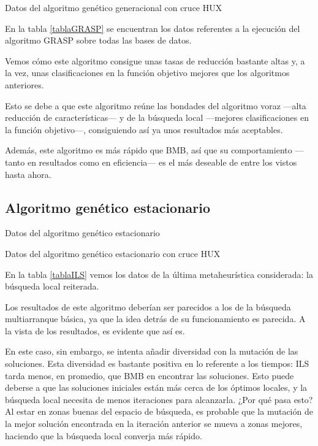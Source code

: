 \documentclass[a4paper, 11pt, titlepage]{article}
\begin{document}
    \begin{table}[!htb]
        \maketable{\dataAGGHUX}
        \caption{Datos del algoritmo genético generacional con cruce HUX}
        \label{tablaAGGHUX}
    \end{table}

    En la tabla \ref{tablaGRASP} se encuentran los datos referentes a la ejecución del algoritmo GRASP sobre todas las bases de datos.

    Vemos cómo este algoritmo consigue unas tasas de reducción bastante altas y, a la vez, unas clasificaciones en la función objetivo mejores que los algoritmos anteriores.

    Esto se debe a que este algoritmo reúne las bondades del algoritmo voraz ---alta reducción de características--- y de la búsqueda local ---mejores clasificaciones en la función objetivo---, consiguiendo así ya unos resultados más aceptables.

    Además, este algoritmo es más rápido que BMB, así que su comportamiento ---tanto en resultados como en eficiencia--- es el más deseable de entre los vistos hasta ahora.


    \subsection{Algoritmo genético estacionario}
    \begin{table}[!htb]
        \maketable{\dataAGE}
        \caption{Datos del algoritmo genético estacionario}
        \label{tablaAGE}
    \end{table}

    \begin{table}[!htb]
        \maketable{\dataAGEHUX}
        \caption{Datos del algoritmo genético estacionario con cruce HUX}
        \label{tablaAGEHUX}
    \end{table}

    En la tabla \ref{tablaILS} vemos los datos de la última metaheurística considerada: la búsqueda local reiterada.

    Los resultados de este algoritmo deberían ser parecidos a los de la búsqueda multiarranque básica, ya que la idea detrás de su funcionamiento es parecida. A la vista de los resultados, es evidente que así es.

    En este caso, sin embargo, se intenta añadir diversidad con la mutación de las soluciones. Esta diversidad es bastante positiva en lo referente a los tiempos: ILS tarda menos, en promedio, que BMB en encontrar las soluciones. Esto puede deberse a que las soluciones iniciales están más cerca de los óptimos locales, y la búsqueda local necesita de menos iteraciones para alcanzarla. ¿Por qué pasa esto? Al estar en zonas buenas del espacio de búsqueda, es probable que la mutación de la mejor solución encontrada en la iteración anterior se mueva a zonas mejores, haciendo que la búsqueda local converja más rápido.
\end{document}
